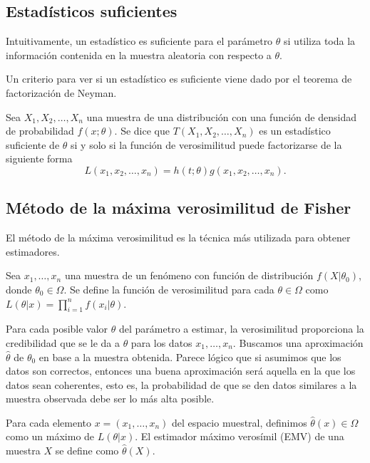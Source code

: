 \documentclass{article}
\begin{document}
\subsection{Estadísticos suficientes}

Intuitivamente, un estadístico es suficiente para el parámetro $\theta$ si utiliza toda la información contenida en la muestra aleatoria con respecto a $\theta$.

Un criterio para ver si un estadístico es suficiente viene dado por el teorema de factorización de Neyman.

\begin{thm}
    Sea $X_1, X_2, \ldots, X_n$ una muestra de una distribución con una función de densidad de probabilidad $f(x;\theta)$. Se dice que $T(X_1, X_2, \ldots, X_n)$ es un estadístico suficiente de $\theta$ si y solo si la función de verosimilitud puede factorizarse de la siguiente forma
    \[L(x_1, x_2, \ldots, x_n) = h(t;\theta) g(x_1, x_2, \ldots, x_n).\]
\end{thm}

\subsection{Método de la máxima verosimilitud de Fisher}

    El método de la máxima verosimilitud es la técnica más utilizada para obtener estimadores.

    \begin{definition}
        Sea $x_1, \ldots, x_n$ una muestra de un fenómeno con función de distribución $f(X | \theta_0)$, donde $\theta_0 \in \Omega$. Se define la función de verosimilitud para cada $\theta \in \Omega$ como $L(\theta | x) = \prod_{i = 1}^n f(x_i| \theta)$.
    \end{definition}

    Para cada posible valor $\theta$ del parámetro a estimar, la verosimilitud proporciona la credibilidad que se le da a $\theta$ para los datos $x_1, \ldots, x_n$. Buscamos una aproximación $\hat{\theta}$ de $\theta_0$ en base a la muestra obtenida. Parece lógico que si asumimos que los datos son correctos, entonces una buena aproximación será aquella en la que los datos sean coherentes, esto es, la probabilidad de que se den datos similares a la muestra observada debe ser lo más alta posible.

    \begin{definition}
        Para cada elemento $x = (x_1, \ldots, x_n)$ del espacio muestral, definimos $\hat{\theta}(x) \in \Omega$ como un máximo de $L(\theta | x)$. El estimador máximo verosímil (EMV) de una muestra $X$ se define como $\hat{\theta}(X)$.
    \end{definition}
\end{document}
